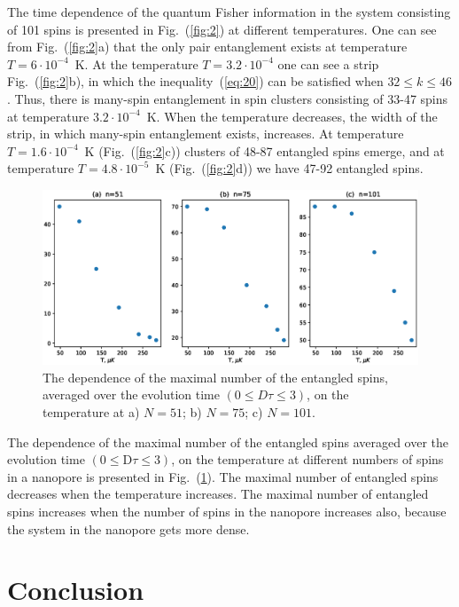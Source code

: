 \documentclass[review]{elsarticle}
\begin{document}
The time dependence of the quantum Fisher information in the system consisting of 101 spins is presented in Fig.~(\ref{fig:2}) at different temperatures. 
One can see from Fig.~(\ref{fig:2}a) that the only pair entanglement exists at temperature $T=6\cdot10^{-4}$~K.
At the temperature $T=3.2\cdot10^{-4}$ one can see a strip Fig.~(\ref{fig:2}b), in which the inequality~(\ref{eq:20}) can be satisfied when ${32}\leq {k}\leq{46}$.
Thus, there is many-spin entanglement in spin clusters consisting of 33-47 spins at temperature $3.2\cdot10^{-4}$~K.
When the temperature decreases, the width of the strip, in which many-spin entanglement exists, increases. 
At temperature $T=1.6\cdot10^{-4}$~K (Fig.~(\ref{fig:2}c)) clusters of 48-87 entangled spins emerge, and at temperature $T=4.8\cdot10^{-5}$~K (Fig.~(\ref{fig:2}d)) we have 47-92 entangled spins.

\begin{figure}
  	\includegraphics[width=0.95\linewidth]{entangled_spins_by_n.eps}
	\caption{
	    The dependence of the maximal number of the entangled spins,
	    averaged over the evolution time $(0 \leq D\tau \leq 3)$, 
	    on the temperature at a) $N=51$; b) $N=75$; c) $N=101$.
	}
	\label{fig:3}
\end{figure}

The dependence of the maximal number of the entangled spins averaged over the evolution time $({0}\leq \mathrm{D}\tau\leq{3})$, on the temperature at different numbers of spins in a nanopore is presented in Fig.~(\ref{fig:3}).
The maximal number of entangled spins decreases when the temperature increases. 
The maximal number of entangled spins increases when the number of spins in the nanopore increases also, because the system in the nanopore gets more dense. 



\section{Conclusion}
\label{sec:6}
\end{document}
